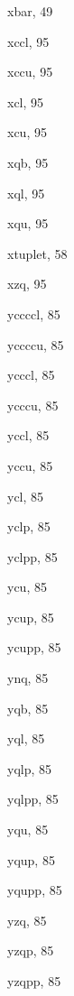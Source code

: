 \begin{theindex}
  \indexspace

  \item {\Bslash xbar}, 49
  \item {\Bslash xccl}, 95
  \item {\Bslash xccu}, 95
  \item {\Bslash xcl}, 95
  \item {\Bslash xcu}, 95
  \item {\Bslash xqb}, 95
  \item {\Bslash xql}, 95
  \item {\Bslash xqu}, 95
  \item {\Bslash xtuplet}, 58
  \item {\Bslash xzq}, 95

  \indexspace

  \item {\Bslash yccccl}, 85
  \item {\Bslash yccccu}, 85
  \item {\Bslash ycccl}, 85
  \item {\Bslash ycccu}, 85
  \item {\Bslash yccl}, 85
  \item {\Bslash yccu}, 85
  \item {\Bslash ycl}, 85
  \item {\Bslash yclp}, 85
  \item {\Bslash yclpp}, 85
  \item {\Bslash ycu}, 85
  \item {\Bslash ycup}, 85
  \item {\Bslash ycupp}, 85
  \item {\Bslash ynq}, 85
  \item {\Bslash yqb}, 85
  \item {\Bslash yql}, 85
  \item {\Bslash yqlp}, 85
  \item {\Bslash yqlpp}, 85
  \item {\Bslash yqu}, 85
  \item {\Bslash yqup}, 85
  \item {\Bslash yqupp}, 85
  \item {\Bslash yzq}, 85
  \item {\Bslash yzqp}, 85
  \item {\Bslash yzqpp}, 85

  \indexspace


\end{theindex}
